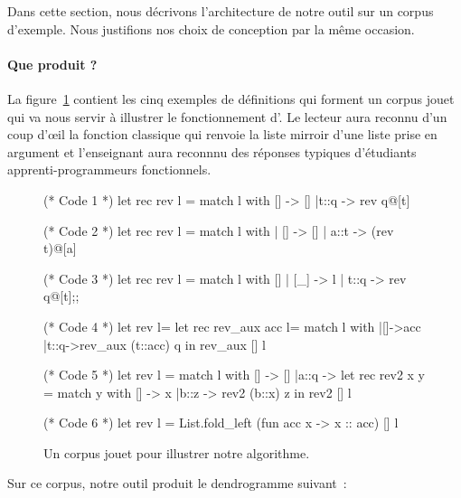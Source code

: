 Dans cette section, nous décrivons l'architecture de notre outil sur
un corpus d'exemple. Nous justifions nos choix de conception par la
même occasion.


\paragraph{Que produit {\Asak}?}
La figure~\ref{fig:example:sources} contient les cinq
exemples de définitions {\OCaml} qui forment un corpus jouet
qui va nous servir à illustrer le fonctionnement d'{\Asak}.
Le lecteur aura reconnu d'un coup d'{\oe}il la fonction classique qui
renvoie la liste mirroir d'une liste prise en argument et l'enseignant
aura reconnnu des réponses typiques d'étudiants apprenti-programmeurs
fonctionnels.

\begin{figure}
\begin{multicols}{2}
\begin{ocaml}
(* Code 1 *)
let rec rev l = match l with
    [] -> []
  |t::q -> rev q@[t]

(* Code 2 *)
let rec rev l =
  match l with
  | [] -> []
  | a::t -> (rev t)@[a]

(* Code 3 *)
let rec rev l = match l with
    [] | [_] -> l
  | t::q -> rev q@[t];;
\end{ocaml}
\begin{ocaml}
(* Code 4 *)
let rev l=
  let rec rev_aux acc l=
    match l with
    |[]->acc
    |t::q->rev_aux (t::acc) q
  in rev_aux [] l

(* Code 5 *)
let rev l =
  match l with
    [] -> []
  |a::q -> let rec rev2 x y = match y with
        [] -> x
      |b::z -> rev2 (b::x) z in rev2 [] l

(* Code 6 *)
let rev l =
  List.fold_left (fun acc x -> x :: acc) [] l
\end{ocaml}
\end{multicols}
\label{fig:example:sources}
\caption{Un corpus jouet pour illustrer notre algorithme.}
\end{figure}

Sur ce corpus, notre outil produit le dendrogramme suivant~:

